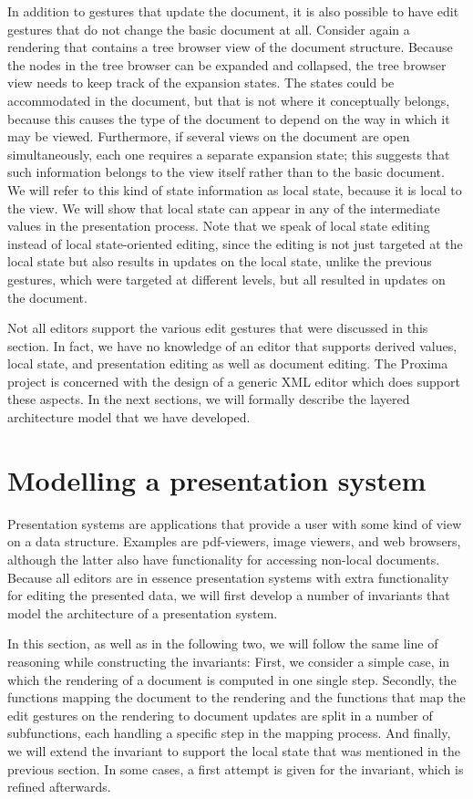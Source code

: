  In addition to gestures that update the document, it is also possible to have edit gestures that do not change the basic document at all. Consider again a rendering that contains a tree browser view of the document structure. Because the nodes in the tree browser can be expanded and collapsed, the tree browser view needs to keep track of the expansion states. The states could be accommodated in the document, but that is not where it conceptually belongs, because this causes the type of the document to depend on the way in which it may be viewed. Furthermore, if several views on the document are open simultaneously, each one requires a separate expansion state; this suggests that such information belongs to the view itself rather than to the basic document. We will refer to this kind of state information as local state, because it is local to the view. We will show that local state can appear in any of the intermediate values in the presentation process. Note that we speak of local state editing instead of local state-oriented editing, since the editing is not just targeted at the local state but also results in updates on the local state, unlike the previous gestures, which were targeted at different levels, but all resulted in updates on the document.

Not all editors support the various edit gestures that were discussed in this section. In fact, we have no knowledge of an editor that supports derived values, local state, and presentation editing as well as document editing.  The Proxima project is concerned with the design of a generic XML editor which does support these aspects. In the next sections, we will formally describe the layered architecture model that we have developed.
\section{Modelling a presentation system}
\label{presenting}



Presentation systems are applications that provide a user with some kind of view on a data structure. Examples are pdf-viewers, image viewers, and web browsers, although the latter also have functionality for accessing non-local documents. Because all editors are in essence presentation systems with extra functionality for editing the presented data, we will first develop a number of invariants that model the architecture of a presentation system.

In this section, as well as in the following two, we will follow the same line of reasoning while constructing the invariants: First, we consider a simple case, in which the rendering of a document is computed in one single step. Secondly, the functions mapping the document to the rendering and the functions that map the edit gestures on the rendering to document updates are split in a number of subfunctions, each handling a specific step in the mapping process. And finally, we will extend the invariant to support the local state that was mentioned in the previous section. In some cases, a first attempt is given for the invariant, which is refined afterwards. 


